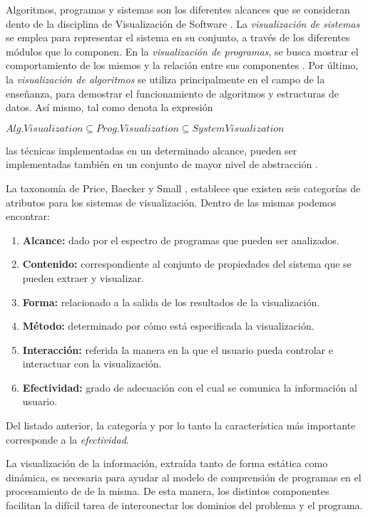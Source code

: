 Algoritmos, programas y sistemas son los diferentes alcances que se consideran
dento de la disciplina de Visualización de Software \cite{PriceBaeckerSmall93,Myers90}.
La \textit{visualización de sistemas} se emplea para representar el sistema en su conjunto,
a través de los diferentes módulos que lo componen.
En la \textit{visualización de programas}, se busca mostrar el comportamiento de los mismos
y la relación entre sus componentes \cite{BenAri01}.
Por último, la \textit{visualización de algoritmos} se utiliza principalmente en el campo 
de la enseñanza, para demostrar el funcionamiento de algoritmos y estructuras de datos.
Así mismo, tal como denota la expresión 
\begin{center}
    $Alg. Visualization \subseteq Prog. Visualization \subseteq System Visualization$
\end{center}
las técnicas implementadas en un determinado alcance, pueden ser implementadas
también en un conjunto de mayor nivel de abstracción \cite{BeronHenriquesPereiraUzal07}.

La taxonomía de Price, Baecker y Small \cite{PriceBaeckerSmall93}, establece que
existen seis categorías de atributos para los sistemas de visualización.
Dentro de las mismas podemos encontrar:
\begin{enumerate}
    \item \textbf{Alcance:} dado por el espectro de programas que pueden ser analizados.
    \item \textbf{Contenido:} correspondiente al conjunto de propiedades del sistema que se 
    pueden extraer y visualizar.
    \item \textbf{Forma:} relacionado a la salida de los resultados de la visualización.
    \item \textbf{Método:} determinado por cómo está especificada la visualización.
    \item \textbf{Interacción:} referida la manera en la que el usuario pueda controlar e
    interactuar con la visualización.
    \item \textbf{Efectividad:} grado de adecuación con el cual se comunica la información
    al usuario.
\end{enumerate}
Del listado anterior, la categoría y por lo tanto la característica más importante corresponde
a la \textit{efectividad}.

La visualización de la información, extraída tanto de forma estática como dinámica,
es necesaria para ayudar al modelo de comprensión de programas en el procesamiento de
de la misma.
De esta manera, los distintos componentes facilitan la difícil tarea de
interconectar los dominios del problema y el programa.
